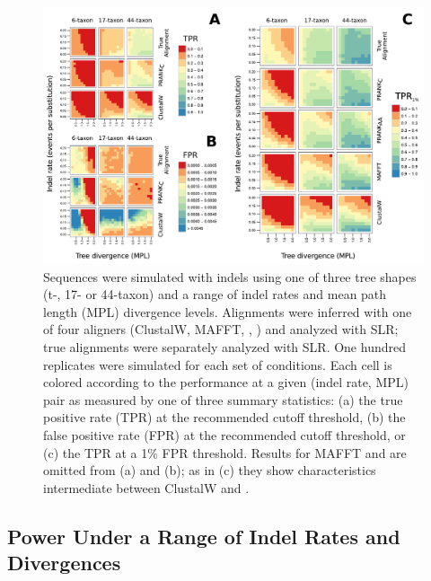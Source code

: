 \documentclass{article}
\begin{document}
\begin{figure}[t]
\begin{center}
\includegraphics[scale=0.8]{fig4.pdf}
\end{center}
\caption{Sequences were simulated with indels using one of three tree
  shapes (t-, 17- or 44-taxon) and a range of indel rates and mean
  path length (MPL) divergence levels. Alignments were inferred with
  one of four aligners (ClustalW, MAFFT, \pranka{}, \prankc) and
  analyzed with SLR; true alignments were separately analyzed with
  SLR. One hundred replicates were simulated for each set of
  conditions. Each cell is colored according to the performance at a
  given (indel rate, MPL) pair as measured by one of three summary
  statistics: (a) the true positive rate (TPR) at the recommended
  cutoff threshold, (b) the false positive rate (FPR) at the
  recommended cutoff threshold, or (c) the TPR at a 1\% FPR
  threshold. Results for MAFFT and \pranka are omitted from (a) and
  (b); as in (c) they show characteristics intermediate between
  ClustalW and \prankc.}
\label{fig_4}
\end{figure}

\subsection*{\Sw Power Under a Range of Indel Rates and Divergences}
\end{document}
